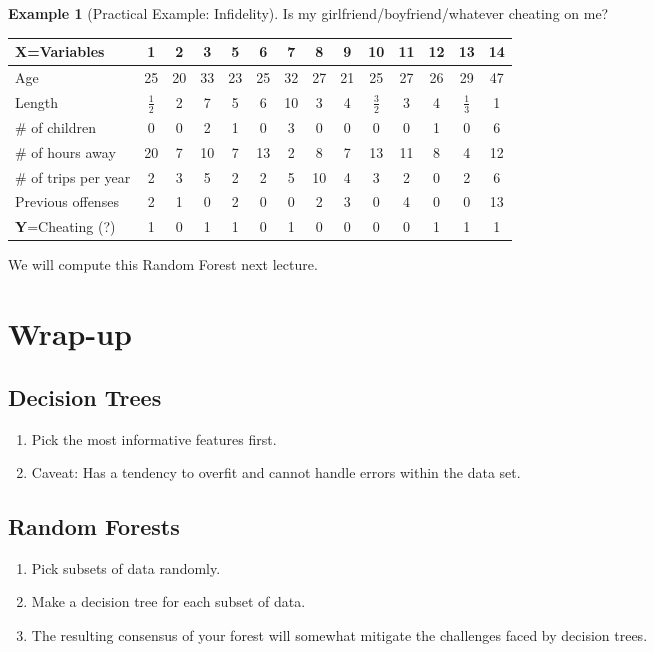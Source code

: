 \documentclass{article}
\theoremstyle{definition}
\newtheorem{myExample}{Example}
\begin{document}
\newpage
\begin{siderules}
\begin{myExample}[Practical Example: Infidelity]
Is my girlfriend/boyfriend/whatever cheating on me?
\begin{center}
\begin{tabular}{| l || c | c | c | c | c | c | c | c | c | c | c | c | c |}
\hline
\textbf{X}=\textbf{Variables} & 1 & 2 & 3 & 5 & 6 & 7 & 8 & 9 & 10 & 11 & 12 & 13 & 14  \\ \hline \hline
Age & 25 & 20 & 33 & 23 & 25 & 32 & 27 & 21 & 25 & 27 & 26 & 29 & 47  \\ \hline
Length & $\frac{1}{2}$ & 2 & 7 & 5 & 6 & 10 & 3 & 4 & $\frac{3}{2}$ & 3 & 4 & $\frac{1}{3}$ & 1 \\ \hline
\# of children & 0 & 0 & 2 & 1 & 0 & 3 & 0 & 0 & 0 & 0 & 1 & 0 & 6 \\ \hline
\# of hours away & 20 & 7 & 10 & 7 & 13 & 2 & 8 & 7 & 13 & 11 & 8 & 4 & 12 \\ \hline
\# of trips per year & 2 & 3 & 5 & 2 & 2 & 5 & 10 & 4 & 3 & 2 & 0 & 2 & 6 \\ \hline
Previous offenses & 2 & 1 & 0 & 2 & 0 & 0 & 2 & 3 & 0 & 4 & 0 & 0 & 13 \\ \hline \hline 
\textbf{Y}=Cheating (?) & 1 & 0 & 1 & 1 & 0 & 1 & 0 & 0 & 0 & 0 & 1 & 1 & 1\\ \hline 
\end{tabular}
\end{center}
We will compute this Random Forest next lecture.
\end{myExample}
\end{siderules}
\section{Wrap-up}
\subsection*{Decision Trees}
\begin{enumerate}[-]

\item
Pick the most informative features first.\newline
\item
Caveat: Has a tendency to overfit and cannot handle errors within the data set.
\end{enumerate}

\subsection*{Random Forests}
\begin{enumerate}[-]
\item
Pick subsets of data randomly.\newline
\item
Make a decision tree for each subset of data.\newline
\item
The resulting consensus of your forest will somewhat mitigate the challenges faced by decision trees.
\end{enumerate}
\end{document}
